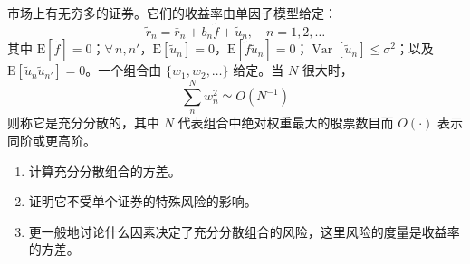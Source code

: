 
\par\noindent\begin{minipage}{\linewidth}
\begin{problem}
 市场上有无穷多的证券。它们的收益率由单因子模型给定：
\[
    \tilde{r}_{n}=\bar{r}_{n}+b_{n}\tilde{f}+\tilde{u}_{n},\quad n=1,2,\ldots
\]
其中 $\mathrm{E}[\tilde{f}]=0$；$\forall\,n,n'$，$\mathrm{E}[\tilde{u}_{n}]=0$，$\mathrm{E}[\tilde{f}\tilde{u}_{n}]=0$；$\operatorname{Var}[\tilde{u}_{n}]\le\sigma^{2}$；以及 $\mathrm{E}[\tilde{u}_{n}\tilde{u}_{n'}]=0$。一个组合由 $\{w_{1},w_{2},\ldots\}$ 给定。当 $N$ 很大时，
\[
    \sum_{n}^{N}w_{n}^{2}\simeq O(N^{-1})
\]
则称它是充分分散的，其中 $N$ 代表组合中绝对权重最大的股票数目而 $O(\cdot)$ 表示同阶或更高阶。
\begin{enumerate}[label=(\alph*)]
    \item 计算充分分散组合的方差。
    \item 证明它不受单个证券的特殊风险的影响。
    \item 更一般地讨论什么因素决定了充分分散组合的风险，这里风险的度量是收益率的方差。
\end{enumerate}
\end{problem}
\end{minipage}\par
{}
